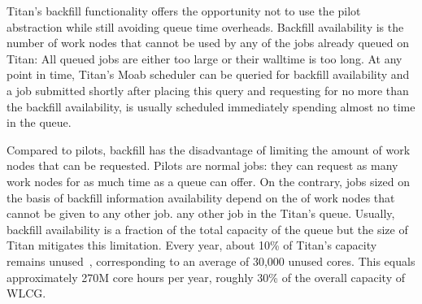 Titan's backfill functionality offers the opportunity not to use the pilot
abstraction while still avoiding queue time overheads. Backfill availability is
the number of work nodes that cannot be used by any of the jobs already queued
on Titan: All queued jobs are either too large or their walltime is too long. At
any point in time, Titan's Moab scheduler can be queried for backfill
availability and a job submitted shortly after placing this query and requesting
for no more than the backfill availability, is usually scheduled immediately
spending almost no time in the queue.

Compared to pilots, backfill has the disadvantage of limiting the amount of
work nodes that can be requested. Pilots are normal jobs: they can request as
many work nodes for as much time as a queue can offer. On the contrary, jobs
sized on the basis of backfill information availability  depend on the %
of work nodes that cannot be given to any other job. any other job in the
Titan's queue. Usually, backfill availability is a fraction of the
total capacity of the queue but the size of Titan mitigates this limitation.
Every year, about 10\% of Titan's capacity remains
unused~\cite{titan_utilization}, corresponding to an average of 30,000 unused
cores. This equals approximately 270M core hours per year, roughly 30\% of the
overall capacity of WLCG.


 

